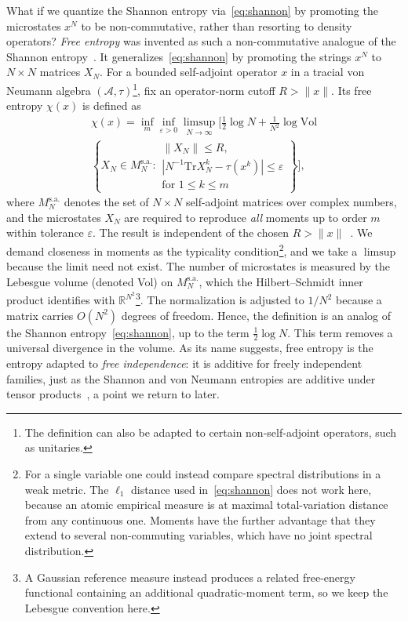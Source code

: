 \documentclass[aps,prl,twocolumn,superscriptaddress,amsmath,amssymb,reprint,longbibliography]{revtex4-2}
\def\eps{\varepsilon}
\newcommand*{\Tr}{\mathrm{Tr}}
\def\A{\mathcal{A}}
\begin{document}
What if we quantize the Shannon entropy via~\eqref{eq:shannon} by promoting the microstates $x^N$ to be non-commutative, rather than resorting to density operators? \emph{Free entropy} was invented as such a non-commutative analogue of the Shannon entropy~\cite{voiculescu1993analogues,voiculescu1994analogues,voiculescu1996analogues,voiculescu1998analogues,voiculescu1999analogues,voiculescu2002free}. It generalizes~\eqref{eq:shannon} by promoting the strings $x^N$ to $N\times N$ matrices $X_N$. For a bounded self-adjoint operator $x$ in a tracial von Neumann algebra $(\A,\tau)$\footnote{The definition can also be adapted to certain non-self-adjoint operators, such as unitaries.}, fix an operator-norm cutoff $R>\|x\|$. Its free entropy $\chi(x)$ is defined as
\begin{multline}\label{eq:free_ent}
\chi(x)=\inf_m\inf_{\eps>0}\limsup_{N\to\infty}\bigg[\frac12\log N
+\frac1{N^2}\log\mathrm{Vol}\\
\left\{X_N\in M_N^{\mathrm{s.a.}}:
\begin{array}{l}
\|X_N\|\le R,\\
|N^{-1}\Tr X_N^k-\tau(x^k)|\le\eps\\
\text{for }1\le k\le m
\end{array}\right\}\bigg],
\end{multline}
where $M^{\mathrm{s.a.}}_N$ denotes the set of $N\times N$ self-adjoint matrices over complex numbers, and the microstates $X_N$ are required to reproduce \emph{all} moments up to order $m$ within tolerance $\eps$. The result is independent of the chosen $R>\|x\|$~\cite{voiculescu2002free}. We demand closeness in moments as the typicality condition\footnote{For a single variable one could instead compare spectral distributions in a weak metric. The $\ell_1$ distance used in~\eqref{eq:shannon} does not work here, because an atomic empirical measure is at maximal total-variation distance from any continuous one. Moments have the further advantage that they extend to several non-commuting variables, which have no joint spectral distribution.}, and we take a $\limsup$ because the limit need not exist. The number of microstates is measured by the Lebesgue volume (denoted Vol) on $M^{\mathrm{s.a.}}_N$, which the Hilbert--Schmidt inner product identifies with $\mathbb{R}^{N^2}$\footnote{A Gaussian reference measure instead produces a related free-energy functional containing an additional quadratic-moment term, so we keep the Lebesgue convention here.}. The normalization is adjusted to $1/N^2$ because a matrix carries $O(N^2)$ degrees of freedom. Hence, the definition is an analog of the Shannon entropy~\eqref{eq:shannon}, up to the term $\frac12\log N$. This term removes a universal divergence in the volume. As its name suggests, free entropy is the entropy adapted to \emph{free independence}: it is additive for freely independent families, just as the Shannon and von Neumann entropies are additive under tensor products~\cite{voiculescu1994analogues}, a point we return to later.
\end{document}
